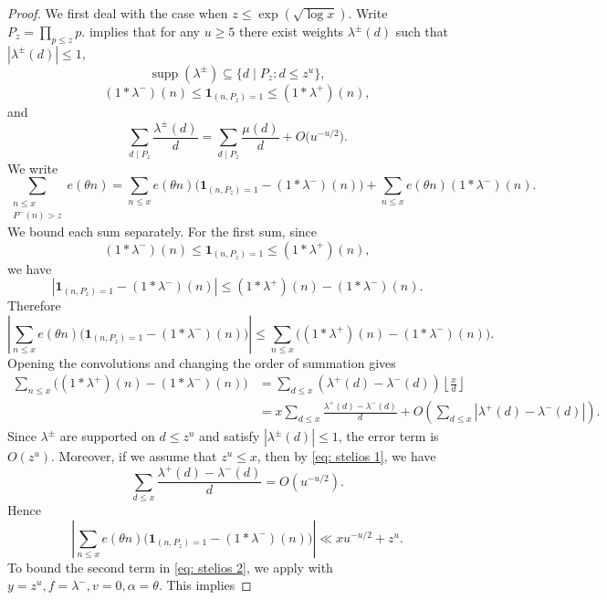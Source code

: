 \documentclass[12pt]{amsart}
\renewcommand{\leq}{\leqslant}
\renewcommand{\geq}{\geqslant}
\numberwithin{equation}{section}
\theoremstyle{plain}
\theoremstyle{definition}
\newcommand{\supp}{\operatorname{supp}}
\begin{document}
	\begin{proof}
		We first deal with the case when $z \leq \exp(\sqrt{\log x})$. Write $P_z = \prod_{p \leq z}p.$  implies that for any $u \geq 5$ there exist weights $\lambda^\pm(d)$ such that $|\lambda^\pm(d)| \leq 1$,
		$$
		\supp(\lambda^\pm) \subseteq \{d \mid P_z : d \leq z^u\},
		$$
		$$
		(1*\lambda^-)(n) \leq \bm{1}_{(n,P_z)=1} \leq (1*\lambda^+)(n),
		$$
		and
		\begin{equation}\label{eq: stelios 1}
			\sum_{d \mid P_z} \frac{\lambda^{\pm}(d)}{d}
			=
			\sum_{d \mid P_z} \frac{\mu(d)}{d}
			+
			O\big( u^{-u/2} \big).
		\end{equation}
		We write
		\begin{equation}\label{eq: stelios 2}
			\sum_{\substack{n \leq x \\ P^-(n)>z}} e(\theta n)
			=
			\sum_{n \leq x} e(\theta n)
			\big(\bm{1}_{(n,P_z)=1}-(1*\lambda^-)(n)\big)
			+
			\sum_{n \leq x} e(\theta n)(1*\lambda^-)(n).
		\end{equation}
		We bound each sum separately. For the first sum, since
		$$
		(1*\lambda^-)(n) \leq \bm{1}_{(n,P_z)=1} \leq (1*\lambda^+)(n),
		$$
		we have
		$$
		\left|\bm{1}_{(n,P_z)=1}-(1*\lambda^-)(n)\right|
		\leq
		(1*\lambda^+)(n)-(1*\lambda^-)(n).
		$$
		Therefore
		$$
		\left|
		\sum_{n \leq x} e(\theta n)
		\big(\bm{1}_{(n,P_z)=1}-(1*\lambda^-)(n)\big)
		\right|
		\leq
		\sum_{n \leq x}
		\big((1*\lambda^+)(n)-(1*\lambda^-)(n)\big).
		$$
		Opening the convolutions and changing the order of summation gives
		\begin{align*}
			\sum_{n \leq x}
			\big((1*\lambda^+)(n)-(1*\lambda^-)(n)\big)
			&=
			\sum_{d \leq x}
			(\lambda^+(d)-\lambda^-(d))
			\left\lfloor \frac{x}{d} \right\rfloor  \\
			&=
			x\sum_{d \leq x}\frac{\lambda^+(d)-\lambda^-(d)}{d}
			+
			O\left(\sum_{d \leq x}|\lambda^+(d)-\lambda^-(d)|\right).
		\end{align*}
		Since $\lambda^\pm$ are supported on $d\leq z^u$ and satisfy $|\lambda^\pm(d)|\leq 1$, the error term is $O(z^u)$. Moreover, if we assume that $z^u \leq x$, then by \eqref{eq: stelios 1}, we have
		$$
		\sum_{d \leq x}\frac{\lambda^+(d)-\lambda^-(d)}{d}
		=
		O(u^{-u/2}).
		$$
		Hence
		\begin{equation}\label{eq: rough first error}
			\left|
			\sum_{n \leq x} e(\theta n)
			\big(\bm{1}_{(n,P_z)=1}-(1*\lambda^-)(n)\big)
			\right|
			\ll
			xu^{-u/2}+z^u .
		\end{equation}
		To bound the second term in \eqref{eq: stelios 2}, we apply  with $y = z^u, f = \lambda^-, v = 0, \alpha = \theta.$ This implies

\end{proof}
\end{document}
